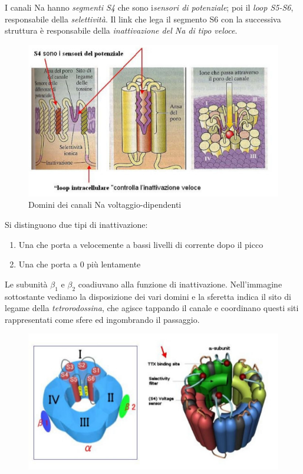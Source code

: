 \documentclass[a4paper,12pt]{article}
\begin{document}
I canali Na hanno \emph{segmenti S4} che sono i\emph{sensori di potenziale}; poi il \emph{loop S5-S6}, responsabile della \emph{selettività}. Il link che lega il segmento S6 con la successiva struttura è responsabile della \emph{inattivazione del Na di tipo veloce}.


\begin{figure}[H]
\centering
\includegraphics[scale=0.45]{immagine/s4.jpg}
\caption{Domini dei canali Na voltaggio-dipendenti}
\end{figure} 

Si distinguono due tipi di inattivazione:
\begin{enumerate}
\item{Una che porta a velocemente a bassi livelli di corrente dopo il picco}
\item{Una che porta a 0 più lentamente}
\end{enumerate}

Le subunità $\beta_{1}$ e $\beta_{2}$ coadiuvano alla funzione di inattivazione. Nell'immagine sottostante vediamo la disposizione dei vari domini e la sferetta indica il sito di legame della \emph{tetrorodossina}, che agisce tappando il canale e coordinano questi siti rappresentati come sfere ed ingombrando il passaggio.
\begin{figure}[H]
\centering
\includegraphics[scale=0.5]{immagine/domini.jpg}
\caption{}
\end{figure} 
\end{document}
